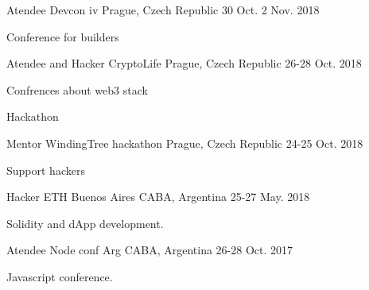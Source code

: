 \begin{cventries}
\cventry
{Atendee} %
{Devcon iv} %
{Prague, Czech Republic} %
{30 Oct. 2 Nov. 2018} %
{ %
\begin{cvitems}
\item {Conference for builders}
\end{cvitems}
}
\cventry
{Atendee and Hacker} %
{CryptoLife} %
{Prague, Czech Republic} %
{26-28 Oct. 2018} %
{ %
\begin{cvitems}
\item {Confrences about web3 stack}
\item {Hackathon}
\end{cvitems}
}
\cventry
{Mentor} %
{WindingTree hackathon} %
{Prague, Czech Republic} %
{24-25 Oct. 2018} %
{ %
\begin{cvitems}
\item {Support hackers}
\end{cvitems}
}
\cventry
{Hacker} %
{ETH Buenos Aires} %
{CABA, Argentina} %
{25-27 May. 2018} %
{ %
\begin{cvitems}
\item {Solidity and dApp development.}
\end{cvitems}
}
\cventry
{Atendee} %
{Node conf Arg} %
{CABA, Argentina} %
{26-28 Oct. 2017} %
{ %
\begin{cvitems}
\item {Javascript conference.}
\end{cvitems}
}
\end{cventries}
